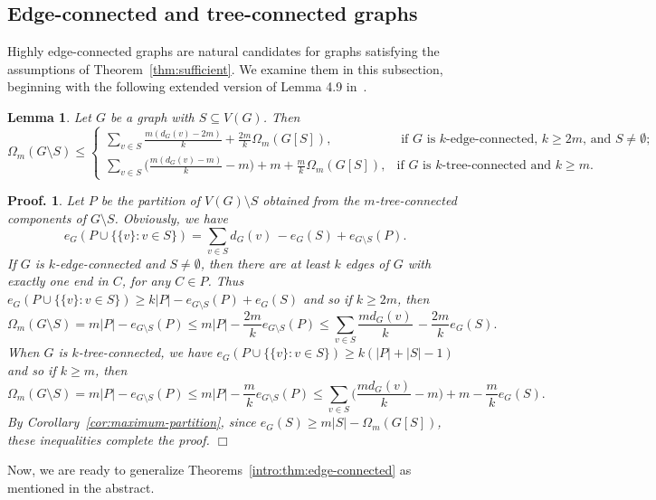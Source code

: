 \documentclass[10pt,bezier]{article}
\newtheorem{prelem}[prethm]{{\bf Lemma}}
\newenvironment{lem}{\begin{prelem}{\hspace{-0.5
em}{\bf.}}}{\end{prelem}}
\newtheorem{preproof}{{\bf Proof.}}
\newenvironment{proof}[1]{\begin{preproof}{\rm
#1}\hfill{$\Box$}}{\end{preproof}}
\begin{document}
\subsection{Edge-connected and tree-connected graphs}
\label{sec:edge-connected}
%
Highly edge-connected graphs are natural candidates for graphs satisfying the assumptions of Theorem~\ref{thm:sufficient}.
We examine them in this subsection, beginning with
 the following extended version of Lemma 4.9 in~\cite{ClosedWalks}.
%
\begin{lem}\label{lem:high-edge-connectivity:Omega}
{Let $G$ be a graph with $ S\subseteq V(G)$. Then
$$\Omega_m(G\setminus S)\le
 \begin{cases}
\sum_{v\in S}\frac{m (d_G(v)-2m)}{k}+\frac{2m}{k}\Omega_m(G[S]),	&\text{ if $G$ is $k$-edge-connected, $k\ge 2m$, and $S\neq \emptyset$};\\ 
 \sum_{v\in S}\big(\frac{m(d_G(v)-m)}{k}-m\big)+m+\frac{m}{k}\Omega_m(G[S]),	&\text{if $G$ is $k$-tree-connected and $k\ge m$}.
\end {cases}$$
}\end{lem}
%
\begin{proof}
{Let $P$ be the partition of $V(G)\setminus S$ obtained from the $m$-tree-connected components of $G\setminus S$. 
Obviously, we have
$$e_G( P\cup \{\{v\}:v\in S\})=\sum_{v\in S}d_G(v)\,-e_G(S)+e_{G\setminus S}(P).$$
If $G$ is $k$-edge-connected and $S\neq \emptyset$, then
 there are at least $k$ edges of $G$ with exactly one end in $C$, for any
$C\in P$. 
Thus
$e_G( P\cup \{\{v\}:v\in S\})\ge k|P|-e_{G\setminus S}(P)+e_G(S)$
and so if $k\ge 2m$, then 
$$\Omega_m(G\setminus S)= m|P|-e_{G\setminus S}(P)\le m|P|-\frac{2m}{k}e_{G\setminus S}(P)\le
 \sum_{v\in S}\frac{md_G(v)}{k}\,-\frac{2m}{k}e_G(S).$$
%
When $G$ is $k$-tree-connected, we have $e_G( P\cup \{\{v\}:v\in S\})\ge k(|P|+|S|-1)$
 and so if $k\ge m$, then
$$\Omega_m(G\setminus S)= m|P|-e_{G\setminus S}(P)\le m|P|-\frac{m}{k}e_{G\setminus S}(P)\le 
\sum_{v\in S}\big(\frac{m d_G(v)}{k}-m\big)+m-\frac{m}{k}e_G(S).$$
By Corollary~\ref{cor:maximum-partition}, since $e_G(S) \ge m|S|-\Omega_m(G[S])$, these inequalities complete the proof.
}\end{proof}
%
Now, we are ready to
generalize Theorems~\ref{intro:thm:edge-connected} as mentioned in the abstract.
%
%
%
\end{document}
